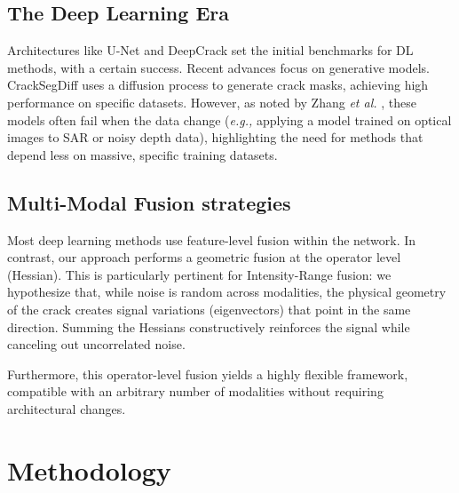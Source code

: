 \documentclass[conference]{IEEEtran}
\newcommand{\eg}[0]{\textit{e.g., }}
\begin{document}
\subsection{The Deep Learning Era}
Architectures like U-Net \cite{Unet2015} and DeepCrack \cite{DeepCrack2019} set the initial benchmarks for DL methods, with a certain success. Recent advances focus on generative models. CrackSegDiff \cite{CrackSegDiff2024} uses a diffusion process to generate crack masks, achieving high performance on specific datasets. However, as noted by Zhang \textit{et al.} \cite{Zhang2025Review}, these models often fail when the data change (\eg applying a model trained on optical images to SAR or noisy depth data), highlighting the need for methods that depend less on massive, specific training datasets.

\subsection{Multi-Modal Fusion strategies}
Most deep learning methods use feature-level fusion within the network.
In contrast, our approach performs a geometric fusion at the operator level (Hessian). This is particularly pertinent for Intensity-Range fusion: we hypothesize that, while noise is random across modalities, the physical geometry of the crack creates signal variations (eigenvectors) that point in the same direction. Summing the Hessians constructively reinforces the signal while canceling out uncorrelated noise.

Furthermore, this operator-level fusion yields a highly flexible framework, compatible with an arbitrary number of modalities without requiring architectural changes.

\section{Methodology}

\end{document}
